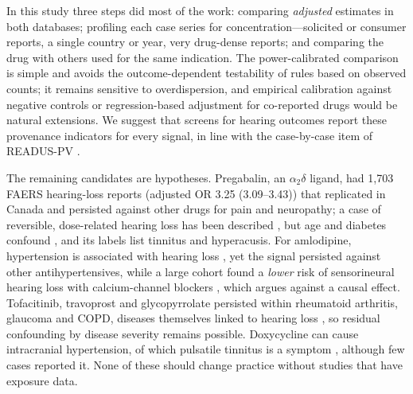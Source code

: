 \documentclass[11pt]{article}
\begin{document}
In this study three steps did most of the work: comparing \emph{adjusted} estimates in both databases;
profiling each case series for concentration---solicited or consumer reports, a single country or year, very drug-dense
reports; and comparing the drug with others used for the same indication. The power-calibrated comparison is simple and avoids
the outcome-dependent testability of rules based on observed counts; it remains sensitive to overdispersion, and empirical
calibration against negative controls \cite{schuemie2014} or regression-based adjustment for co-reported drugs
\cite{caster2010} would be natural extensions. We suggest that screens for hearing outcomes report these provenance
indicators for every signal, in line with the case-by-case item of READUS-PV \cite{readuspv,readuspv_ee}.

The remaining candidates are hypotheses. Pregabalin, an $\alpha_2\delta$ ligand, had 1{,}703
FAERS hearing-loss reports (adjusted OR
3.25 (3.09--3.43))
that replicated in Canada and persisted against other drugs for pain and neuropathy; a case of reversible, dose-related hearing
loss has been described \cite{pregabalin_case}, but age and diabetes confound \cite{diabetes_hearing}, and its labels list
tinnitus and hyperacusis. For amlodipine, hypertension is associated with hearing loss \cite{htn_hearing}, yet the signal
persisted against other antihypertensives, while a large cohort found a \emph{lower} risk of sensorineural hearing loss with
calcium-channel blockers \cite{ccb_cohort}, which argues against a causal effect. Tofacitinib, travoprost and glycopyrrolate
persisted within rheumatoid arthritis, glaucoma and COPD, diseases themselves linked to hearing loss
\cite{ra_hearing,glaucoma_hearing,copd_hearing}, so residual confounding by disease severity remains possible. Doxycycline
can cause intracranial hypertension, of which pulsatile tinnitus is a symptom \cite{doxy_iih}, although few cases reported
it. None of these should change practice without studies that have exposure data.
\end{document}
